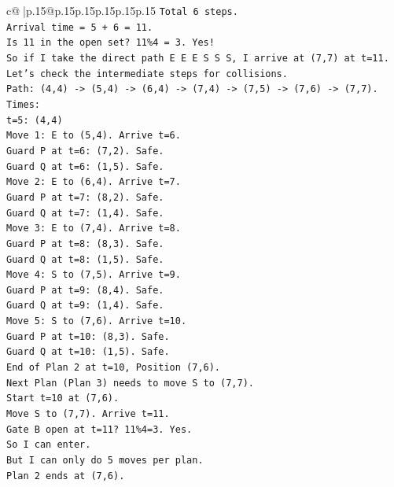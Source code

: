 \documentclass{article}
\begin{document}
{\begin{supertabular}{c@{$\;$}|p{.15\linewidth}@{}p{.15\linewidth}p{.15\linewidth}p{.15\linewidth}p{.15\linewidth}p{.15\linewidth}}
{{{\texttt{Total 6 steps.} \\
\texttt{Arrival time = 5 + 6 = 11.} \\
\texttt{Is 11 in the open set? 11\%4 = 3. Yes!} \\
\texttt{So if I take the direct path E E E S S S, I arrive at (7,7) at t=11.} \\
\texttt{Let's check the intermediate steps for collisions.} \\
\texttt{Path: (4,4) {-}> (5,4) {-}> (6,4) {-}> (7,4) {-}> (7,5) {-}> (7,6) {-}> (7,7).} \\
\texttt{Times:} \\
\texttt{t=5: (4,4)} \\
\texttt{Move 1: E to (5,4). Arrive t=6.} \\
\texttt{Guard P at t=6: (7,2). Safe.} \\
\texttt{Guard Q at t=6: (1,5). Safe.} \\
\texttt{Move 2: E to (6,4). Arrive t=7.} \\
\texttt{Guard P at t=7: (8,2). Safe.} \\
\texttt{Guard Q at t=7: (1,4). Safe.} \\
\texttt{Move 3: E to (7,4). Arrive t=8.} \\
\texttt{Guard P at t=8: (8,3). Safe.} \\
\texttt{Guard Q at t=8: (1,5). Safe.} \\
\texttt{Move 4: S to (7,5). Arrive t=9.} \\
\texttt{Guard P at t=9: (8,4). Safe.} \\
\texttt{Guard Q at t=9: (1,4). Safe.} \\
\texttt{Move 5: S to (7,6). Arrive t=10.} \\
\texttt{Guard P at t=10: (8,3). Safe.} \\
\texttt{Guard Q at t=10: (1,5). Safe.} \\
\texttt{End of Plan 2 at t=10, Position (7,6).} \\
\texttt{Next Plan (Plan 3) needs to move S to (7,7).} \\
\texttt{Start t=10 at (7,6).} \\
\texttt{Move S to (7,7). Arrive t=11.} \\
\texttt{Gate B open at t=11? 11\%4=3. Yes.} \\
\texttt{So I can enter.} \\
\texttt{But I can only do 5 moves per plan.} \\
\texttt{Plan 2 ends at (7,6).} \\
}}}
\end{supertabular}}
\end{document}
